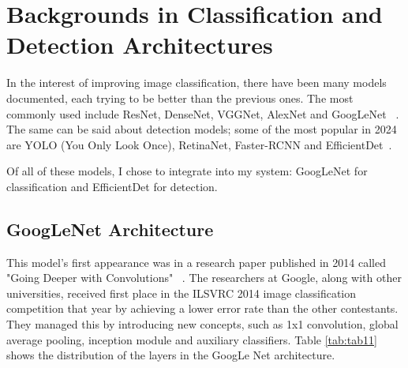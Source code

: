 \chapter{Backgrounds in Classification and Detection Architectures}
\label{chap:ch3}

In the interest of improving image classification, there have been many models documented, each trying to be better than the previous ones. The most commonly used include ResNet, DenseNet, VGGNet, AlexNet and GoogLeNet ~\cite{link8}. The same can be said about detection models; some of the most popular in 2024 are YOLO (You Only Look Once), RetinaNet, Faster-RCNN and EfficientDet~\cite{carte11}.

Of all of these models, I chose to integrate into my system: GoogLeNet for classification and EfficientDet for detection.

\section{GoogLeNet Architecture}

This model's first appearance was in a research paper published in 2014 called "Going Deeper with Convolutions" ~\cite{carte13}. The researchers at Google, along with other universities, received first place in the ILSVRC 2014 image classification competition that year by achieving a lower error rate than the other contestants. They managed this by introducing new concepts, such as 1x1 convolution, global average pooling, inception module and auxiliary classifiers. Table \ref{tab:tab11} shows the distribution of the layers in the GoogLe Net architecture.

